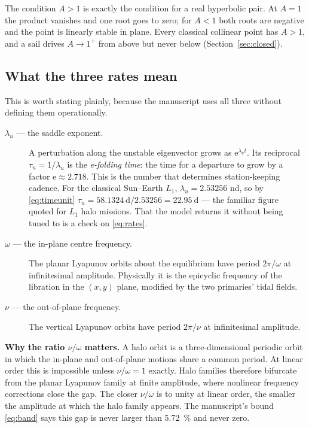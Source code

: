 \documentclass[11pt,a4paper]{article}
\begin{document}
The condition $A>1$ is exactly the condition for a real hyperbolic pair. At
$A=1$ the product vanishes and one root goes to zero; for $A<1$ both roots are
negative and the point is linearly stable in plane. Every classical collinear
point has $A>1$, and a sail drives $A\to1^+$ from above but never below
(Section~\ref{sec:closed}).

\subsection{What the three rates mean}\label{sec:meaning}

This is worth stating plainly, because the manuscript uses all three without
defining them operationally.

\begin{description}
\item[$\lambda_u$ --- the saddle exponent.] A perturbation along the unstable
eigenvector grows as $\mathrm{e}^{\lambda_u t}$. Its reciprocal
$\tau_u=1/\lambda_u$ is the \emph{e-folding time}: the time for a departure to
grow by a factor $\mathrm{e}\approx2.718$. This is the number that determines
station-keeping cadence. For the classical Sun--Earth $L_1$,
$\lambda_u=\num{2.53256}$ nd, so by \eqref{eq:timeunit}
$\tau_u=\SI{58.1324}{\day}/2.53256=\SI{22.95}{\day}$ --- the familiar figure
quoted for $L_1$ halo missions. That the model returns it without being tuned
to is a check on \eqref{eq:rates}.

\item[$\omega$ --- the in-plane centre frequency.] The planar Lyapunov orbits
about the equilibrium have period $2\pi/\omega$ at infinitesimal amplitude.
Physically it is the epicyclic frequency of the libration in the
$(x,y)$ plane, modified by the two primaries' tidal fields.

\item[$\nu$ --- the out-of-plane frequency.] The vertical Lyapunov orbits have
period $2\pi/\nu$ at infinitesimal amplitude.
\end{description}

\noindent\textbf{Why the ratio $\nu/\omega$ matters.} A halo orbit is a
three-dimensional periodic orbit in which the in-plane and out-of-plane motions
share a common period. At linear order this is impossible unless
$\nu/\omega=1$ exactly. Halo families therefore bifurcate from the planar
Lyapunov family at finite amplitude, where nonlinear frequency corrections close
the gap. The closer $\nu/\omega$ is to unity at linear order, the smaller the
amplitude at which the halo family appears. The manuscript's bound
\eqref{eq:band} says this gap is never larger than \SI{5.72}{\percent} and
never zero.
\end{document}
